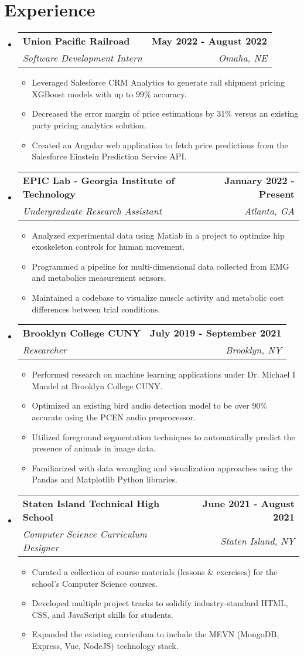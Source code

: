 \documentclass[letterpaper,11pt]{article}
\makeatletter
\newcommand{\resumeItem}[1]{
  \item\small{
    {#1 \vspace{-2pt}}
  }
}
\newcommand{\resumeSubheading}[4]{
  \vspace{-2pt}\item
    \begin{tabular*}{1.0\textwidth}[t]{l@{\extracolsep{\fill}}r}
      \textbf{#1} & \textbf{\small #2} \\
      \textit{\small#3} & \textit{\small #4} \\
    \end{tabular*}\vspace{-7pt}
}
\newcommand{\resumeSubHeadingListStart}{\begin{itemize}[leftmargin=0.0in, label={}]}
\newcommand{\resumeSubHeadingListEnd}{\end{itemize}}
\newcommand{\resumeItemListStart}{\begin{itemize}[leftmargin=0.15in]}
\newcommand{\resumeItemListEnd}{\end{itemize}\vspace{-5pt}}
\makeatother
\begin{document}
\section{Experience}
\resumeSubHeadingListStart
\resumeSubheading
{Union Pacific Railroad}{May 2022 - August 2022}
{Software Development Intern}{Omaha, NE}
\resumeItemListStart
\resumeItem{Leveraged Salesforce CRM Analytics to generate rail shipment pricing XGBoost models with up to 99\% accuracy.}
\resumeItem{Decreased the error margin of price estimations by 31\% versus an existing \nth{3} party pricing analytics solution.}
\resumeItem{Created an Angular web application to fetch price predictions from the Salesforce Einstein Prediction Service API.}
\resumeItemListEnd
\resumeSubheading
{EPIC Lab - Georgia Institute of Technology}{January 2022 - Present}
{Undergraduate Research Assistant}{Atlanta, GA}
\resumeItemListStart
\resumeItem{Analyzed experimental data using Matlab in a project to optimize hip exoskeleton controls for human movement.}
\resumeItem{Programmed a pipeline for multi-dimensional data collected from EMG and metabolics measurement sensors.}
\resumeItem{Maintained a codebase to visualize muscle activity and metabolic cost differences between trial conditions.}
\resumeItemListEnd
\resumeSubheading
{Brooklyn College CUNY}{July 2019 - September 2021}
{Researcher}{Brooklyn, NY}
\resumeItemListStart
\resumeItem{Performed research on machine learning applications under Dr. Michael I Mandel at Brooklyn College CUNY.}
\resumeItem{Optimized an existing bird audio detection model to be over 90\% accurate using the PCEN audio preprocessor.}
\resumeItem{Utilized foreground segmentation techniques to automatically predict the presence of animals in image data.}
\resumeItem{Familiarized with data wrangling and visualization approaches using the Pandas and Matplotlib Python libraries.}
\resumeItemListEnd
\resumeSubheading
{Staten Island Technical High School}{June 2021 - August 2021}
{Computer Science Curriculum Designer}{Staten Island, NY}
\resumeItemListStart
\resumeItem{Curated a collection of course materials (lessons \& exercises) for the school's Computer Science courses.}
\resumeItem{Developed multiple project tracks to solidify industry-standard HTML, CSS, and JavaScript skills for students.}
\resumeItem{Expanded the existing curriculum to include the MEVN (MongoDB, Express, Vue, NodeJS) technology stack.}
\resumeItemListEnd
\resumeSubHeadingListEnd
\vspace{-16pt}

\end{document}
